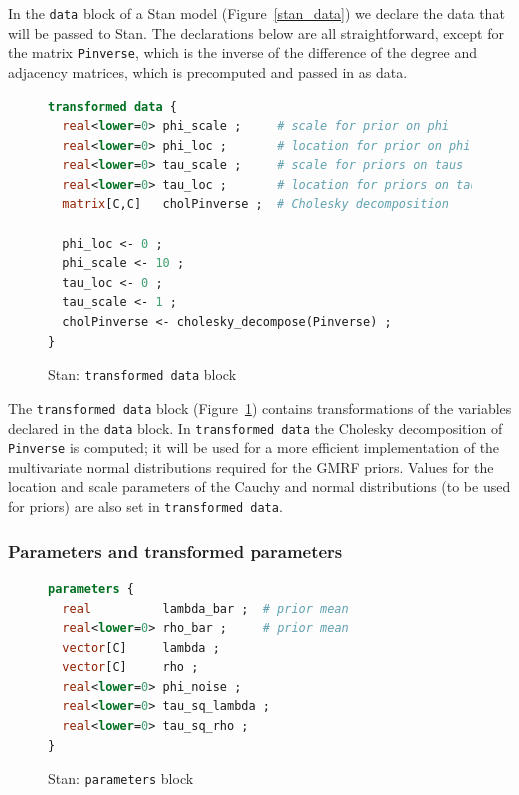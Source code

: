 In the {\tt data} block of a Stan model (Figure~\ref{stan_data}) we declare the data that will be passed to Stan. The declarations below are all straightforward, except for the matrix {\tt Pinverse}, which is the inverse of the difference of the degree and adjacency matrices, which is precomputed and passed in as data. 

\begin{figure}[h]
\begin{lstlisting}[language=Stan, frame=trBL]
transformed data {
  real<lower=0> phi_scale ;     # scale for prior on phi
  real<lower=0> phi_loc ;       # location for prior on phi
  real<lower=0> tau_scale ;     # scale for priors on taus
  real<lower=0> tau_loc ;       # location for priors on taus
  matrix[C,C]   cholPinverse ;  # Cholesky decomposition 
  
  phi_loc <- 0 ;
  phi_scale <- 10 ;
  tau_loc <- 0 ;
  tau_scale <- 1 ;
  cholPinverse <- cholesky_decompose(Pinverse) ;
}
\end{lstlisting}
\caption{Stan: {\tt transformed data} block}
\label{stan_transformed_data}
\end{figure}


The {\tt transformed data} block (Figure~\ref{stan_transformed_data}) contains transformations of the variables declared in the {\tt data} block. In {\tt transformed data} the Cholesky decomposition of {\tt Pinverse} is computed; it will be used for a more efficient implementation of the multivariate normal distributions required for the GMRF priors. Values for the location and scale parameters of the Cauchy and normal distributions (to be used for priors) are also set in {\tt transformed data}. 






\subsubsection{Parameters and transformed parameters}

\begin{figure}[h]
\begin{lstlisting}[language=Stan, frame=trBL]
parameters {
  real          lambda_bar ;  # prior mean 
  real<lower=0> rho_bar ;     # prior mean 
  vector[C]     lambda ;      
  vector[C]     rho ;
  real<lower=0> phi_noise ;    
  real<lower=0> tau_sq_lambda ;  
  real<lower=0> tau_sq_rho ;
}
\end{lstlisting}
\caption{Stan: {\tt parameters} block}
\label{stan_parameters}
\end{figure}

